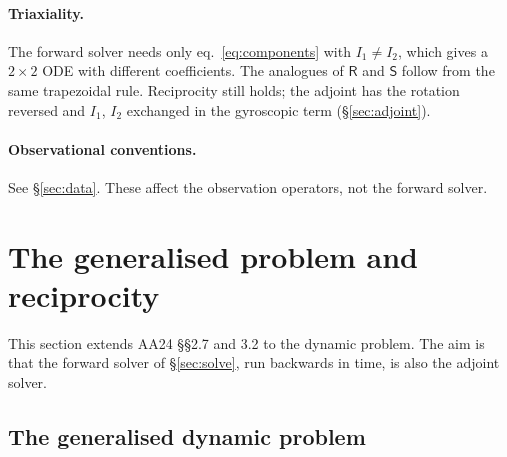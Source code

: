\documentclass[11pt,a4paper]{article}
\newcommand{\R}{\mathsf{R}}
\newcommand{\Sm}{\mathsf{S}}
\begin{document}
\paragraph{Triaxiality.} The forward solver needs only eq.~\eqref{eq:components} with $I_1\neq I_2$,
which gives a $2\times2$ ODE with different coefficients. The analogues of $\R$ and $\Sm$ follow
from the same trapezoidal rule. Reciprocity still holds; the adjoint has the rotation reversed and $I_1$, $I_2$
exchanged in the gyroscopic term (\S\ref{sec:adjoint}).

\paragraph{Observational conventions.} See \S\ref{sec:data}. These affect the observation
operators, not the forward solver.

\section{The generalised problem and reciprocity}
\label{sec:recip}

This section extends AA24 \S\S2.7 and 3.2 to the dynamic problem. The aim is that the forward
solver of \S\ref{sec:solve}, run backwards in time, is also the adjoint solver.

\subsection{The generalised dynamic problem}
\label{sec:gen}
\end{document}
